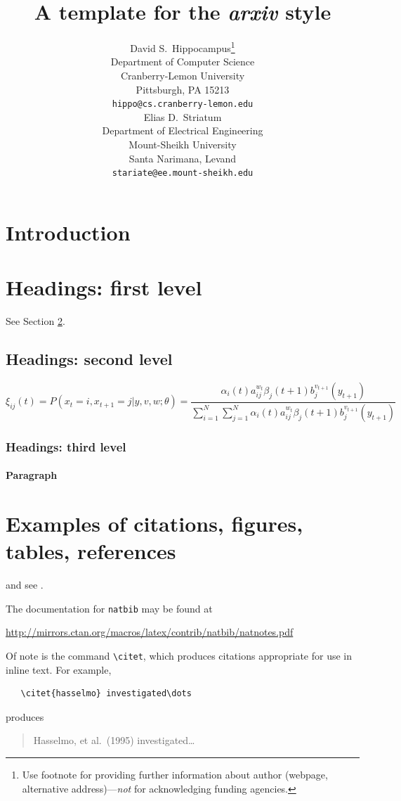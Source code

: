 \documentclass{article}
\title{A template for the \emph{arxiv} style}
\author{
  David S.~Hippocampus\thanks{Use footnote for providing further
    information about author (webpage, alternative
    address)---\emph{not} for acknowledging funding agencies.} \\
  Department of Computer Science\\
  Cranberry-Lemon University\\
  Pittsburgh, PA 15213 \\
  \texttt{hippo@cs.cranberry-lemon.edu} \\
   \And
 Elias D.~Striatum \\
  Department of Electrical Engineering\\
  Mount-Sheikh University\\
  Santa Narimana, Levand \\
  \texttt{stariate@ee.mount-sheikh.edu} \\
}
\begin{document}
\maketitle

\begin{abstract}
\lipsum[1]
\end{abstract}




\section{Introduction}
\lipsum[2]
\lipsum[3]


\section{Headings: first level}
\label{sec:headings}

\lipsum[4] See Section \ref{sec:headings}.

\subsection{Headings: second level}
\lipsum[5]
\begin{equation}
\xi _{ij}(t)=P(x_{t}=i,x_{t+1}=j|y,v,w;\theta)= {\frac {\alpha _{i}(t)a^{w_t}_{ij}\beta _{j}(t+1)b^{v_{t+1}}_{j}(y_{t+1})}{\sum _{i=1}^{N} \sum _{j=1}^{N} \alpha _{i}(t)a^{w_t}_{ij}\beta _{j}(t+1)b^{v_{t+1}}_{j}(y_{t+1})}}
\end{equation}

\subsubsection{Headings: third level}
\lipsum[6]

\paragraph{Paragraph}
\lipsum[7]

\section{Examples of citations, figures, tables, references}
\label{sec:others}
\lipsum[8] \cite{kour2014real,kour2014fast} and see \cite{hadash2018estimate}.

The documentation for \verb+natbib+ may be found at
\begin{center}
  \url{http://mirrors.ctan.org/macros/latex/contrib/natbib/natnotes.pdf}
\end{center}
Of note is the command \verb+\citet+, which produces citations
appropriate for use in inline text.  For example,
\begin{verbatim}
   \citet{hasselmo} investigated\dots
\end{verbatim}
produces
\begin{quote}
  Hasselmo, et al.\ (1995) investigated\dots
\end{quote}
\end{document}
